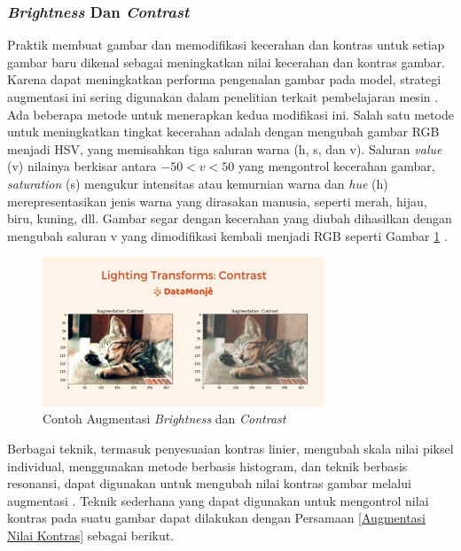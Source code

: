    

\subsubsection{\textit{Brightness} Dan \textit{Contrast}}

    Praktik membuat gambar dan memodifikasi kecerahan dan kontras untuk setiap gambar baru dikenal sebagai meningkatkan 
    nilai kecerahan dan kontras gambar. Karena dapat meningkatkan performa pengenalan gambar pada model, strategi 
    augmentasi ini sering digunakan dalam penelitian terkait pembelajaran mesin \cite{mikolajczyk2018data, Yang2022}. 
    Ada beberapa metode untuk menerapkan kedua modifikasi ini. Salah satu metode untuk meningkatkan tingkat kecerahan 
    adalah dengan mengubah gambar RGB menjadi HSV, yang memisahkan tiga saluran warna (h, s, dan v). 
    Saluran \textit{value} (v) nilainya berkisar antara $-50 < v < 50$ yang mengontrol kecerahan gambar,
     \textit{saturation} (s) mengukur intensitas atau kemurnian warna dan \textit{hue} (h) merepresentasikan jenis warna yang dirasakan manusia, seperti merah, hijau, biru, kuning, dll. Gambar segar dengan kecerahan yang diubah dihasilkan dengan mengubah saluran v yang dimodifikasi kembali menjadi RGB seperti Gambar \ref{Contoh Augmentasi Contrast} \cite{oza2020empirical, Stollnitz1996}.

    \begin{figure}[H]
      \centering
      \includegraphics[width=0.75\textwidth]{figures/bab2/Lighting-Transforms-Contrast-augmentation.jpg}
      \caption{Contoh Augmentasi \textit{Brightness} dan\textit{ Contrast} \cite{anand}}
      \label{Contoh Augmentasi Contrast}

    
     \end{figure} 
    
    Berbagai teknik, termasuk penyesuaian kontras linier, mengubah skala nilai piksel individual, 
    menggunakan metode berbasis histogram, dan teknik berbasis resonansi, dapat digunakan untuk 
    mengubah nilai kontras gambar melalui augmentasi \cite{Bebis2021, Maragatham2015, szeliski2021computer}. 
    Teknik sederhana yang dapat digunakan untuk mengontrol nilai kontras pada suatu gambar dapat dilakukan dengan 
    Persamaan \ref{Augmentasi Nilai Kontras} sebagai berikut.

